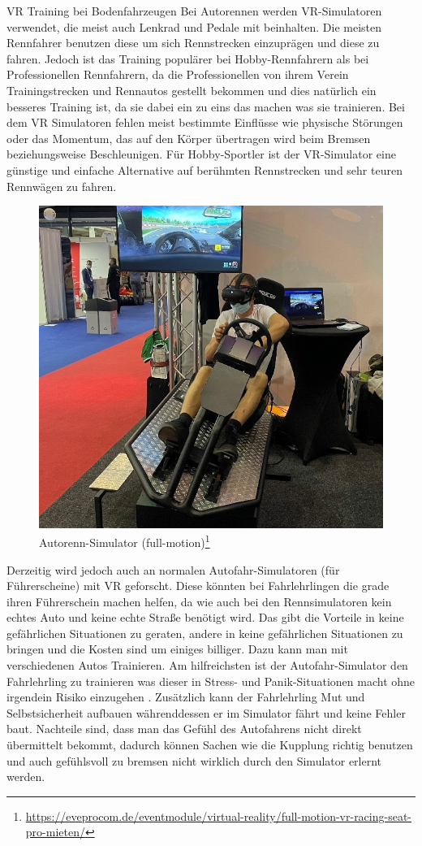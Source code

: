 VR Training bei Bodenfahrzeugen
Bei Autorennen werden VR-Simulatoren verwendet, die meist auch Lenkrad und Pedale mit beinhalten. Die meisten Rennfahrer benutzen diese um sich Rennstrecken einzuprägen und diese zu fahren. Jedoch ist das Training populärer bei Hobby-Rennfahrern als bei Professionellen Rennfahrern, da die Professionellen von ihrem Verein Trainingstrecken und Rennautos gestellt bekommen und dies natürlich ein besseres Training ist, da sie dabei ein zu eins das machen was sie trainieren. Bei dem VR Simulatoren fehlen meist bestimmte Einflüsse wie physische Störungen oder das Momentum, das auf den Körper übertragen wird beim Bremsen beziehungsweise Beschleunigen. Für Hobby-Sportler ist der VR-Simulator eine günstige und einfache Alternative auf berühmten Rennstrecken und sehr teuren Rennwägen zu fahren. 
\begin{figure}[!ht]
    \centering
    \includegraphics[width=1.0\textwidth]{images/Abbildung 2.jpg}
    \caption{\label{fig:Abbildung 2}Autorenn-Simulator (full-motion)\footnote{\url{https://eveprocom.de/eventmodule/virtual-reality/full-motion-vr-racing-seat-pro-mieten/}}\protect
    }
\end{figure}
Derzeitig wird jedoch auch an normalen Autofahr-Simulatoren (für Führerscheine) mit VR geforscht. Diese könnten bei Fahrlehrlingen die grade ihren Führerschein machen helfen, da wie auch bei den Rennsimulatoren kein echtes Auto und keine echte Straße benötigt wird. Das gibt die Vorteile in keine gefährlichen Situationen zu geraten, andere in keine gefährlichen Situationen zu bringen und die Kosten sind um einiges billiger. Dazu kann man mit verschiedenen Autos Trainieren. Am hilfreichsten ist der Autofahr-Simulator den Fahrlehrling zu trainieren was dieser in Stress- und Panik-Situationen macht ohne irgendein Risiko einzugehen \cite{ihemedu2017virtual}. Zusätzlich kann der Fahrlehrling Mut und Selbstsicherheit aufbauen währenddessen er im Simulator fährt und keine Fehler baut. Nachteile sind, dass man das Gefühl des Autofahrens nicht direkt übermittelt bekommt, dadurch können Sachen wie die Kupplung richtig benutzen und auch gefühlsvoll zu bremsen nicht wirklich durch den Simulator erlernt werden.
